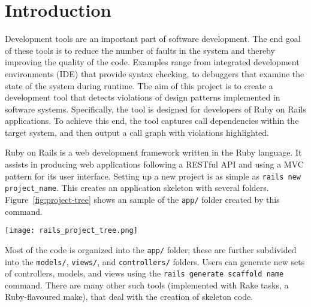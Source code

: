 \chapter{Introduction}
Development tools are an important part of software development. The end goal of these tools is to reduce the number of faults in the system and thereby improving the quality of the code. Examples range from integrated development environments (IDE) that provide syntax checking, to debuggers that examine the state of the system during runtime. The aim of this project is to create a development tool that detects violations of design patterns implemented in software systems. Specifically, the tool is designed for developers of Ruby on Rails applications. To achieve this end, the tool captures call dependencies within the target system, and then output a call graph with violations highlighted. 

Ruby on Rails is a web development framework written in the Ruby language. It assists in producing web applications following a RESTful API and using a MVC pattern for its user interface. Setting up a new project is as simple as  {\lstinline[breaklines=true] |rails new project_name|}. This creates an application skeleton with several folders. Figure~\ref{fig:project-tree} shows an sample of the {\lstinline |app/|} folder created by this command.

\begin{center}
    \texttt{[image: rails\_project\_tree.png]}
    \label{fig:project-tree}
\end{center}
Most of the code is organized into the {\lstinline |app/|} folder; these are further subdivided into the {\lstinline |models/|}, {\lstinline |views/|}, and {\lstinline |controllers/|} folders. Users can generate new sets of controllers, models, and views using the {\lstinline |rails generate scaffold name|} command. There are many other such tools (implemented with Rake tasks, a Ruby-flavoured make), that deal with the creation of skeleton code.

